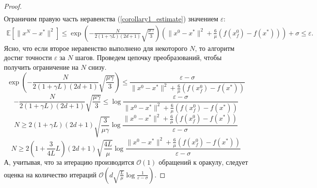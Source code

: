 \documentclass{article}
\begin{document}
\begin{proof}
\begin{equation*}
\begin{aligned}
   \end{aligned}
  \end{equation*}
  Ограничим правую часть неравенства (\ref{corollary1_estimate}) значением $\varepsilon$:
  \begin{equation}
   \begin{aligned}
   \mathbb{E}[\|x^N - x^*\|^2] \leqslant \exp\left(- \frac{N}{2 (1 + \gamma L) (2d + 1)}\sqrt{\frac{\mu\gamma}{3}}\right) \left(\|x^0 - x^*\|^2 + \frac{6}{\mu} (f(x_f^0) - f(x^*))\right) + \sigma \leqslant \varepsilon.
   \end{aligned}
  \end{equation}
  Ясно, что если второе неравенство выполнено для некоторого $N$, то алгоритм достиг точности $\varepsilon$ за $N$ шагов. Проведем цепочку преобразований, чтобы получить ограничение на $N$ снизу.
  $$\exp\left(- \frac{N}{2 (1 + \gamma L) (2d + 1)}\sqrt{\frac{\mu\gamma}{3}}\right)  \leqslant \frac{\varepsilon - \sigma}{\|x^0 - x^*\|^2 + \frac{6}{\mu} (f(x_f^0) - f(x^*))}$$
  $$- \frac{N}{2 (1 + \gamma L) (2d + 1)}\sqrt{\frac{\mu\gamma}{3}} \leqslant \log \frac{\varepsilon - \sigma}{\|x^0 - x^*\|^2 + \frac{6}{\mu} (f(x_f^0) - f(x^*))}$$
  $$N \geqslant 2 (1 + \gamma L) (2d + 1) \sqrt{\frac{3}{\mu \gamma}} \log \frac{\|x^0 - x^*\|^2 + \frac{6}{\mu} (f(x_f^0) - f(x^*))}{\varepsilon - \sigma}$$
  $$N \geqslant 2 \left(1 + \frac{3}{4L} L\right) (2d + 1) \sqrt{\frac{4L}{\mu}} \log \frac{\|x^0 - x^*\|^2 + \frac{6}{\mu} (f(x_f^0) - f(x^*))}{\varepsilon - \sigma}$$
  А, учитывая, что за итерацию производится $\mathcal{O}(1)$ обращений к оракулу, следует оценка на количество итераций $\mathcal{O}\left(d \sqrt{\frac{L}{\mu}} \log \frac{1}{\varepsilon - \sigma}\right)$.
\end{proof}
\end{document}
